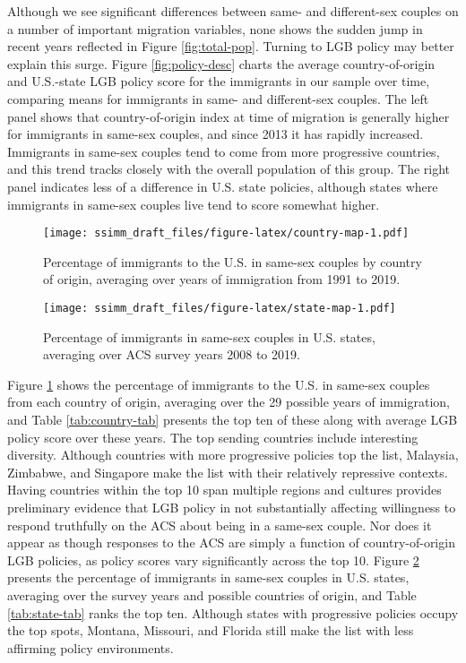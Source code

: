 \documentclass[
  12pt,
]{article}
\begin{document}
Although we see significant differences between same- and different-sex couples on a number of important migration variables, none shows the sudden jump in recent years reflected in Figure \ref{fig:total-pop}. Turning to LGB policy may better explain this surge. Figure \ref{fig:policy-desc} charts the average country-of-origin and U.S.-state LGB policy score for the immigrants in our sample over time, comparing means for immigrants in same- and different-sex couples. The left panel shows that country-of-origin index at time of migration is generally higher for immigrants in same-sex couples, and since 2013 it has rapidly increased. Immigrants in same-sex couples tend to come from more progressive countries, and this trend tracks closely with the overall population of this group. The right panel indicates less of a difference in U.S. state policies, although states where immigrants in same-sex couples live tend to score somewhat higher.

\begin{figure}
\centering
\texttt{[image: ssimm\_draft\_files/figure-latex/country-map-1.pdf]}
\caption{\label{fig:country-map}Percentage of immigrants to the U.S. in same-sex couples by country of origin, averaging over years of immigration from 1991 to 2019.}
\end{figure}

\begin{figure}
\centering
\texttt{[image: ssimm\_draft\_files/figure-latex/state-map-1.pdf]}
\caption{\label{fig:state-map}Percentage of immigrants in same-sex couples in U.S. states, averaging over ACS survey years 2008 to 2019.}
\end{figure}

Figure \ref{fig:country-map} shows the percentage of immigrants to the U.S. in same-sex couples from each country of origin, averaging over the 29 possible years of immigration, and Table \ref{tab:country-tab} presents the top ten of these along with average LGB policy score over these years. The top sending countries include interesting diversity. Although countries with more progressive policies top the list, Malaysia, Zimbabwe, and Singapore make the list with their relatively repressive contexts. Having countries within the top 10 span multiple regions and cultures provides preliminary evidence that LGB policy in not substantially affecting willingness to respond truthfully on the ACS about being in a same-sex couple. Nor does it appear as though responses to the ACS are simply a function of country-of-origin LGB policies, as policy scores vary significantly across the top 10. Figure \ref{fig:state-map} presents the percentage of immigrants in same-sex couples in U.S. states, averaging over the survey years and possible countries of origin, and Table \ref{tab:state-tab} ranks the top ten. Although states with progressive policies occupy the top spots, Montana, Missouri, and Florida still make the list with less affirming policy environments.
\end{document}
